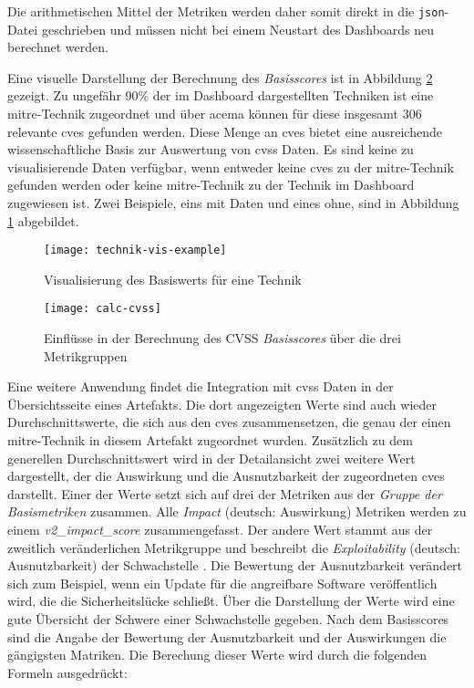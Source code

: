 Die arithmetischen Mittel der Metriken werden daher somit direkt in die \verb|json|-Datei geschrieben und müssen nicht bei einem Neustart des Dashboards neu berechnet werden.

Eine visuelle Darstellung der Berechnung des \textit{Basisscores} ist in Abbildung \ref{fig:calc-cvss} gezeigt. Zu ungefähr 90\% der im Dashboard dargestellten Techniken ist eine \gls{mitre}-Technik zugeordnet und über \gls{acema} können für diese insgesamt 306 relevante \glspl{cve} gefunden werden. Diese Menge an \glspl{cve} bietet eine ausreichende wissenschaftliche Basis zur Auswertung von \gls{cvss} Daten. Es sind keine zu visualisierende Daten verfügbar, wenn entweder keine \glspl{cve} zu der \gls{mitre}-Technik gefunden werden oder keine \gls{mitre}-Technik zu der Technik im Dashboard zugewiesen ist. Zwei Beispiele, eins mit Daten und eines ohne, sind in Abbildung \ref{fig:technik-vis-example} abgebildet.

\begin{figure}
    \centering
    \texttt{[image: technik-vis-example]}
    \caption{Visualisierung des Basiswerts für eine Technik}
    \label{fig:technik-vis-example}
\end{figure}


\begin{figure}
    \centering
    \texttt{[image: calc-cvss]}
    \caption{Einflüsse in der Berechnung des CVSS \textit{Basisscores} über die drei Metrikgruppen}
    \label{fig:calc-cvss}
\end{figure}

\par Eine weitere Anwendung findet die Integration mit \gls{cvss} Daten in der Übersichtsseite eines Artefakts. Die dort angezeigten Werte sind auch wieder Durchschnittswerte, die sich aus den \glspl{cve} zusammensetzen, die genau der einen \gls{mitre}-Technik in diesem Artefakt zugeordnet wurden. Zusätzlich zu dem generellen Durchschnittswert wird in der Detailansicht zwei weitere Wert dargestellt, der die Auswirkung und die Ausnutzbarkeit der zugeordneten \glspl{cve} darstellt. Einer der Werte setzt sich auf drei der Metriken aus der  \textit{Gruppe der Basismetriken} zusammen. Alle \textit{Impact} (deutsch: Auswirkung) Metriken werden zu einem \textit{v2\_impact\_score} zusammengefasst. Der andere Wert stammt aus der zweitlich veränderlichen Metrikgruppe und beschreibt die \textit{Exploitability} (deutsch: Ausnutzbarkeit) der Schwachstelle \autocite{CVSSV2Complete}. Die Bewertung der Ausnutzbarkeit verändert sich zum Beispiel, wenn ein Update für die angreifbare Software veröffentlich wird, die die Sicherheitslücke schließt.
Über die Darstellung der Werte wird eine gute Übersicht der Schwere einer Schwachstelle gegeben. Nach dem Basisscores sind die Angabe der Bewertung der Ausnutzbarkeit und der Auswirkungen die gängigsten Matriken. Die Berechung dieser Werte wird durch die folgenden Formeln ausgedrückt:

